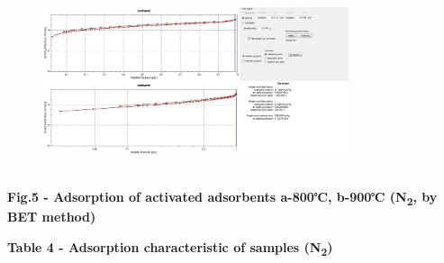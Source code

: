 \begin{figure}[H]
	\centering
	\includegraphics[width=0.8\textwidth]{media/chem2/image103}
	\caption*{}
\end{figure}
 \\

{\bfseries Fig.5 - Adsorption of activated adsorbents a-800℃, b-900℃
(N\textsubscript{2}, by BET method)}

{\bfseries Table 4 - Adsorption characteristic of samples
(N\textsubscript{2})}

